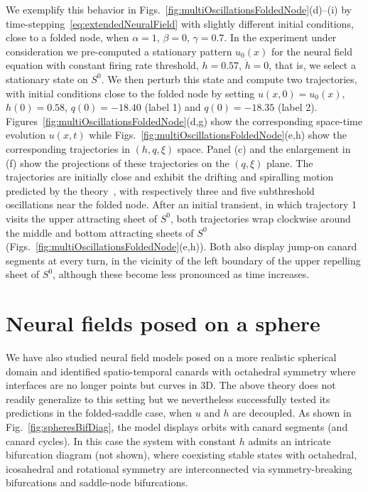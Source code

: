 \documentclass[aps,prl,reprint,superscriptaddress]{revtex4-1}
\newcommand{\edits}[1]{#1}
\begin{document}
We exemplify this behavior in Figs.~\ref{fig:multiOscillationsFoldedNode}(d)--(i) by
time-stepping~\eqref{eq:extendedNeuralField} with slightly different initial conditions, 
close to a folded node, when $\alpha=1$, $\beta=0$, $\gamma=0.7$. In the experiment
under consideration we pre-computed a stationary pattern $u_0(x)$ for the neural
field equation with constant firing rate threshold, $h = 0.57$, $\dot h=0$, that is,
we select a stationary state on $S^0$. We then perturb this state and compute two
trajectories, with initial conditions close to the folded node by setting $u(x,0) =
u_0(x)$, $h(0) = 0.58$, $q(0) = -18.40$ (label 1) and $q(0) = -18.35$ (label 2).
\edits{Figures~\ref{fig:multiOscillationsFoldedNode}(d,g)} show the corresponding space-time
evolution $u(x,t)$ while Figs.~\ref{fig:multiOscillationsFoldedNode}(e,h) show the
corresponding trajectories
in $(h,q,\xi)$ space. Panel (c) and the enlargement in (f) show the projections of these
trajectories on the $(q,\xi)$ plane. The trajectories are initially close
and exhibit the drifting and spiralling motion predicted by the theory~\cite{Desroches2012},
with respectively three and five subthreshold oscillations near the folded node.
After an initial transient, in which trajectory 1 visits the upper attracting sheet
of $S^0$, both trajectories wrap clockwise around the middle and bottom attracting
sheets of $S^0$ (Figs.~\ref{fig:multiOscillationsFoldedNode}(e,h)). Both also
display jump-on canard segments at every turn, in the vicinity of the left boundary of the 
upper repelling sheet of $S^0$, although these become less pronounced as time increases.

\section{Neural fields posed on a sphere}

We have also studied neural field models posed on a more realistic spherical domain
and identified spatio-temporal canards with octahedral
symmetry where interfaces are no longer points but curves in 3D. The above theory does
not readily generalize to this setting but we nevertheless successfully tested its
predictions in the folded-saddle case, when $u$ and $h$ are decoupled. As shown in
Fig.~\ref{fig:spheresBifDiag}, the model displays orbits with canard segments (and
canard cycles). In this case the system with constant $h$ admits an intricate
bifurcation diagram (not shown), where coexisting stable states with octahedral,
icosahedral and rotational symmetry are interconnected via symmetry-breaking
bifurcations and saddle-node bifurcations. 
\end{document}
